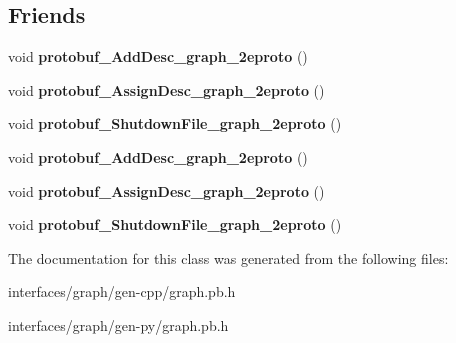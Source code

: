 \subsection*{Friends}
\begin{DoxyCompactItemize}
\item 
\hypertarget{classgraph_1_1Graph_a3216c708da10839178deebea43d6f0be}{
void {\bfseries protobuf\_\-AddDesc\_\-graph\_\-2eproto} ()}
\label{classgraph_1_1Graph_a3216c708da10839178deebea43d6f0be}

\item 
\hypertarget{classgraph_1_1Graph_a4c9d7eb8f9e30e490c8bcae70e629de5}{
void {\bfseries protobuf\_\-AssignDesc\_\-graph\_\-2eproto} ()}
\label{classgraph_1_1Graph_a4c9d7eb8f9e30e490c8bcae70e629de5}

\item 
\hypertarget{classgraph_1_1Graph_aac10332314561225d8ac09b797223f3d}{
void {\bfseries protobuf\_\-ShutdownFile\_\-graph\_\-2eproto} ()}
\label{classgraph_1_1Graph_aac10332314561225d8ac09b797223f3d}

\item 
\hypertarget{classgraph_1_1Graph_a3216c708da10839178deebea43d6f0be}{
void {\bfseries protobuf\_\-AddDesc\_\-graph\_\-2eproto} ()}
\label{classgraph_1_1Graph_a3216c708da10839178deebea43d6f0be}

\item 
\hypertarget{classgraph_1_1Graph_a4c9d7eb8f9e30e490c8bcae70e629de5}{
void {\bfseries protobuf\_\-AssignDesc\_\-graph\_\-2eproto} ()}
\label{classgraph_1_1Graph_a4c9d7eb8f9e30e490c8bcae70e629de5}

\item 
\hypertarget{classgraph_1_1Graph_aac10332314561225d8ac09b797223f3d}{
void {\bfseries protobuf\_\-ShutdownFile\_\-graph\_\-2eproto} ()}
\label{classgraph_1_1Graph_aac10332314561225d8ac09b797223f3d}

\end{DoxyCompactItemize}


The documentation for this class was generated from the following files:\begin{DoxyCompactItemize}
\item 
interfaces/graph/gen-\/cpp/graph.pb.h\item 
interfaces/graph/gen-\/py/graph.pb.h\end{DoxyCompactItemize}

